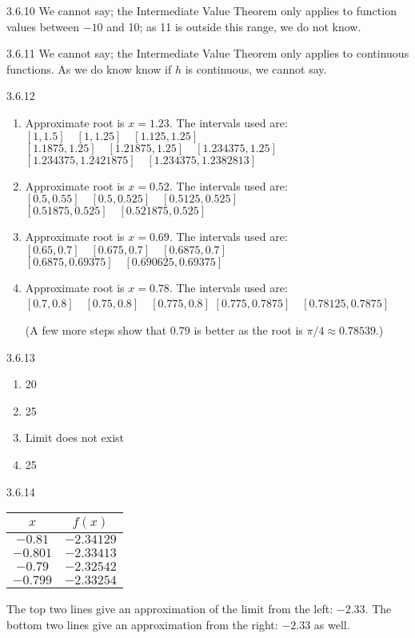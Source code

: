 \begin{Answer}{3.6.10}
 {We cannot say; the Intermediate Value Theorem only applies to function values between $-10$ and 10; as 11 is outside this range, we do not know.
  }
\end{Answer}
\begin{Answer}{3.6.11}
 {We cannot say; the Intermediate Value Theorem only applies to continuous functions. As we do know know if $h$ is continuous, we cannot say.
  }
\end{Answer}
\begin{Answer}{3.6.12}
\begin{enumerate}
\item {Approximate root is $x=1.23$. The intervals used are:
$[1,1.5] \quad [1,1.25] \quad [1.125,1.25]$
$[1.1875,1.25]\quad [1.21875,1.25]\quad [1.234375,1.25]$
$[1.234375,1.2421875]\quad [1.234375,1.2382813]$
}
\item {Approximate root is $x=0.52$. The intervals used are:
$[0.5,0.55] \quad [0.5,0.525] \quad [0.5125,0.525]$
$[0.51875,0.525]\quad [0.521875,0.525]$
}
\item {Approximate root is $x=0.69$. The intervals used are:
$[0.65,0.7] \quad [0.675,0.7] \quad [0.6875,0.7]$
$[0.6875,0.69375]\quad [0.690625,0.69375]$
}
\item {Approximate root is $x=0.78$. The intervals used are:
$[0.7,0.8] \quad [0.75,0.8] \quad [0.775,0.8]$
$[0.775,0.7875]\quad [0.78125,0.7875]$

(A few more steps show that $0.79$ is better as the root is $\pi/4 \approx 0.78539$.)
}
\end{enumerate}
\end{Answer}
\begin{Answer}{3.6.13}
{\begin{enumerate}
\item		20
\item		25
\item		Limit does not exist
\item		25
\end{enumerate}
}

\end{Answer}
\begin{Answer}{3.6.14}


{\begin{tabular}{cc}
$x$ & $f(x)$ \\ \hline
$-0.81 $& $-2.34129$ \\
$ -0.801$ & $-2.33413$ \\
$ -0.79 $& $-2.32542 $\\
$ -0.799$ & $-2.33254$
\end{tabular}

The top two lines give an approximation of the limit from the left: $-2.33$. The bottom two lines give an approximation from the right: $-2.33$ as well.
}
\end{Answer}
